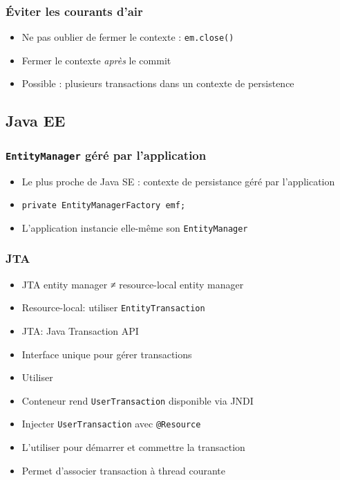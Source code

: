 \documentclass[english, french]{beamer}
\begin{document}
\begin{frame}
	\frametitle{Éviter les courants d’air}
	\begin{itemize}
		\item Ne pas oublier de fermer le contexte : \texttt{em.close()}
		\item Fermer le contexte \emph{après} le commit
		\item Possible : plusieurs transactions dans un contexte de persistence
	\end{itemize}
\end{frame}

\subsection{Java EE}
\begin{frame}
	\frametitle{\texttt{EntityManager} géré par l’application}
	\begin{itemize}
		\item Le plus proche de Java SE : contexte de persistance géré par l’application
		\item {} \texttt{private EntityManagerFactory emf;}
		\item L’application instancie elle-même son \texttt{EntityManager}
	\end{itemize}
\end{frame}

\begin{frame}
	\frametitle{JTA}
	\begin{itemize}
		\item JTA entity manager ≠ resource-local entity manager
		\item Resource-local: utiliser \texttt{EntityTransaction}
		\item JTA: Java Transaction API
		\item Interface unique pour gérer transactions
		\item Utiliser 
		\item Conteneur rend \texttt{UserTransaction} disponible via JNDI
		\item Injecter \texttt{UserTransaction} avec \texttt{@Resource}
		\item L’utiliser pour démarrer et commettre la transaction
		\item Permet d’associer transaction à thread courante
	\end{itemize}
\end{frame}
\end{document}
